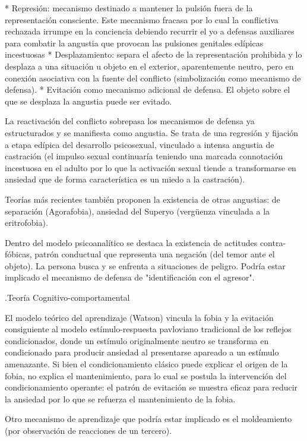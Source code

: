 \documentclass{scrbook}
\begin{document}
* Represión: mecanismo destinado a mantener la pulsión fuera de la representación consciente. Este mecanismo fracasa por lo cual la conflictiva rechazada irrumpe en la conciencia debiendo recurrir el yo a defensas auxiliares para combatir la angustia que provocan las pulsiones genitales edípicas incestuosas
* Desplazamiento: separa el afecto de la representación prohibida y lo desplaza a una situación u objeto en el exterior, aparentemente neutro, pero en conexión asociativa con la fuente del conflicto (simbolización como mecanismo de defensa).
* Evitación como mecanismo adicional de defensa. El objeto sobre el que se desplaza la angustia puede ser evitado.

La reactivación del conflicto sobrepasa los mecanismos de defensa ya estructurados y se manifiesta como angustia. Se trata de una regresión y fijación a etapa edípica del desarrollo psicosexual, vinculado a intensa angustia de castración (el impulso sexual continuaría teniendo una marcada connotación incestuosa en el adulto por lo que la activación sexual tiende a transformarse en ansiedad que de forma característica es un miedo a la castración).

Teorías más recientes también proponen la existencia de otras angustias: de separación (Agorafobia), ansiedad del Superyo (vergüenza vinculada a la eritrofobia).

Dentro del modelo psicoanalítico se destaca la existencia de actitudes contra-fóbicas, patrón conductual que representa una negación (del temor ante el objeto). La persona busca y se enfrenta a situaciones de peligro. Podría estar implicado el mecanismo de defensa de "identificación con el agresor".

.Teoría Cognitivo-comportamental

El modelo teórico del aprendizaje (Watson) vincula la fobia y la evitación consiguiente al modelo estímulo-respuesta pavloviano tradicional de los reflejos condicionados, donde un estímulo originalmente neutro se transforma en condicionado para producir ansiedad al presentarse apareado a un estímulo amenazante. Si bien el condicionamiento clásico puede explicar el origen de la fobia, no explica el mantenimiento, para lo cual se postula la intervención del condicionamiento operante: el patrón de evitación se muestra eficaz para reducir la ansiedad por lo que se refuerza el mantenimiento de la fobia.

Otro mecanismo de aprendizaje que podría estar implicado es el moldeamiento (por observación de reacciones de un tercero).
\end{document}

